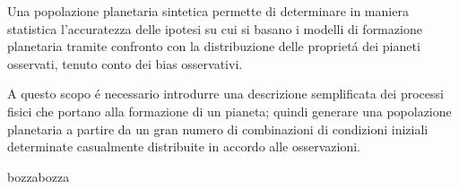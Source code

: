 \documentclass[twoside,11pt,fleqn]{memoir}%
\def\versione{bozza}%
\def\bozza{bozza}
\begin{document}
Una popolazione planetaria sintetica permette di determinare in maniera statistica l'accuratezza delle ipotesi su cui si basano i modelli di formazione planetaria tramite confronto con la distribuzione delle propriet\'a dei pianeti osservati, tenuto conto dei bias osservativi.

A questo scopo  \'e necessario introdurre una descrizione semplificata dei processi fisici che portano alla formazione di un pianeta; quindi generare una popolazione planetaria a partire da un gran numero di combinazioni di condizioni iniziali determinate casualmente distribuite in accordo alle osservazioni.


\cleartorecto



{\let\clearpage\relax\let\cleardoublepage\relax
\backmatter
}

%
\printbibliography
\ifx\versione\bozza
\woc
\erratac
\fi
\end{document}
